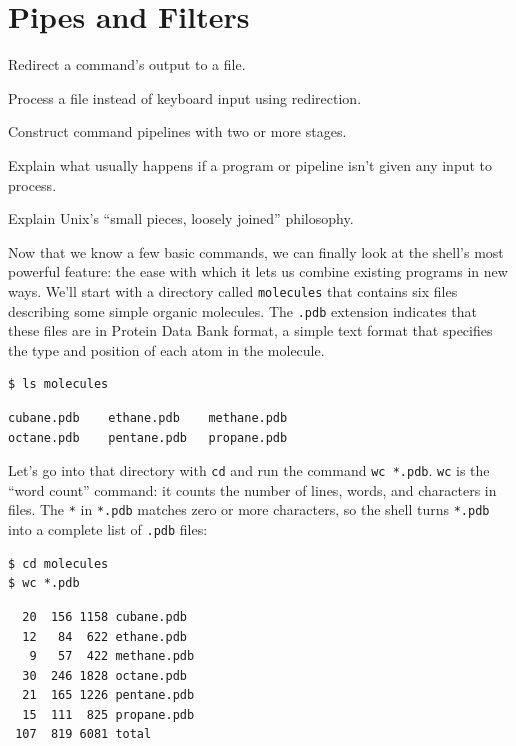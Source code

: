 \documentclass{book}
\begin{document}
\section{Pipes and Filters}

\begin{objectives}
\begin{swcitemize}
\item
  Redirect a command's output to a file.
\item
  Process a file instead of keyboard input using redirection.
\item
  Construct command pipelines with two or more stages.
\item
  Explain what usually happens if a program or pipeline isn't given any
  input to process.
\item
  Explain Unix's ``small pieces, loosely joined'' philosophy.
\end{swcitemize}
\end{objectives}

Now that we know a few basic commands, we can finally look at the
shell's most powerful feature: the ease with which it lets us combine
existing programs in new ways. We'll start with a directory called
\texttt{molecules} that contains six files describing some simple
organic molecules. The \texttt{.pdb} extension indicates that these
files are in Protein Data Bank format, a simple text format that
specifies the type and position of each atom in the molecule.

\begin{verbatim}
$ ls molecules
\end{verbatim}

\begin{verbatim}
cubane.pdb    ethane.pdb    methane.pdb
octane.pdb    pentane.pdb   propane.pdb
\end{verbatim}

Let's go into that directory with \texttt{cd} and run the command
\texttt{wc *.pdb}. \texttt{wc} is the ``word count'' command: it counts
the number of lines, words, and characters in files. The \texttt{*} in
\texttt{*.pdb} matches zero or more characters, so the shell turns
\texttt{*.pdb} into a complete list of \texttt{.pdb} files:

\begin{verbatim}
$ cd molecules
$ wc *.pdb
\end{verbatim}

\begin{verbatim}
  20  156 1158 cubane.pdb
  12   84  622 ethane.pdb
   9   57  422 methane.pdb
  30  246 1828 octane.pdb
  21  165 1226 pentane.pdb
  15  111  825 propane.pdb
 107  819 6081 total
\end{verbatim}
\end{document}
